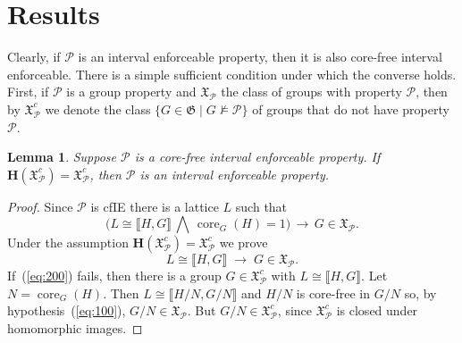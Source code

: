 \documentclass{gen-j-l}
\newcommand{\lb}{\ensuremath{\llbracket}}
\newcommand{\rb}{\ensuremath{\rrbracket}}
\newcommand{\<}{\ensuremath{\langle}}
\renewcommand{\>}{\ensuremath{\rangle}}
\theoremstyle{plain}
\newtheorem{lemma}[theorem]{Lemma}
\theoremstyle{definition}
\theoremstyle{remark}
\numberwithin{theorem}{section}
\numberwithin{claim}{section}
\numberwithin{equation}{section}
\numberwithin{conjecture}{section}
\newcommand{\Meet}{\ensuremath{\bigwedge}}
\newcommand{\core}{\ensuremath{\operatorname{core}}}
\newcommand{\2}{\ensuremath{\mathbf{2}}}
\newcommand{\3}{\ensuremath{\mathbf{3}}}
\newcommand{\sG}{\ensuremath{\mathfrak{X}}}
\newcommand{\G}{\ensuremath{\mathfrak{G}}}
\newcommand{\bH}{\ensuremath{\mathbf{H}}}
\newcommand{\cP}{\ensuremath{\mathcal{P}}}
\begin{document}
\section{Results}
Clearly, if $\cP$ is an interval enforceable property, then it is also
core-free interval enforceable.  There is a simple
sufficient condition under which the converse holds.  
First, if $\cP$ is a group property and $\sG_{\cP}$ the
class of groups with property $\cP$, then by $\sG_{\cP}^c$ we denote the class
$\{G\in \G \mid G\nvDash \cP\}$ 
of groups that do not have property $\cP$.
\begin{lemma}
\label{lemma-wjd-2}
Suppose $\cP$ is a core-free interval enforceable property.  
If $\bH(\sG_{\cP}^c) = \sG_{\cP}^c$, then $\cP$ is an interval enforceable property.
\end{lemma}
\begin{proof}
Since $\cP$ is \acs{cfIE} there is a lattice $L$ such that
\begin{equation}
  \label{eq:100}
\bigl(L \cong \lb H,G \rb \, \Meet \, \core_G(H)=1\bigr) \, \longrightarrow \, G\in \sG_\cP.
\end{equation}
Under the assumption $\bH(\sG_\cP^c) = \sG_\cP^c$ we prove
\begin{equation}
  \label{eq:200}
L \cong \lb H,G \rb \; \longrightarrow \; G\in \sG_\cP.
\end{equation}
If~(\ref{eq:200}) fails, then there is a
group $G\in \sG_{\cP}^c$ with $L\cong \lb H,G \rb$.  Let $N = \core_G(H)$.  Then $L \cong
\lb H/N,G/N \rb$ and $H/N$ is core-free in $G/N$ so, by hypothesis~(\ref{eq:100}),
$G/N \in \sG_\cP$.  But $G/N \in \sG_{\cP}^c$, since $\sG_{\cP}^c$ is closed under homomorphic images.
\end{proof}
\end{document}
